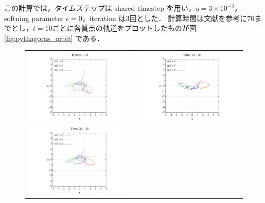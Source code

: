 \documentclass[11pt,a4paper,oneside,onecolumn]{jreport}
\begin{document}
この計算では，タイムステップは shared timestep を用い，$\eta = 3 \times 10^{-3}$，softning parameter $\epsilon = 0$，iteration は3回とした． 計算時間は文献を参考に70までとし，$t = 10$ごとに各質点の軌道をプロットしたものが図 \ref{fig:pythagoras_orbit} である．

\begin{figure}[H]
\begin{tabular}{ccc}
\begin{minipage}[t]{0.45\hsize}
\centering
\includegraphics[width=8cm]{./image/pythagoras_orbit_0to10.pdf}
\end{minipage} &
\begin{minipage}[t]{0.1\hsize}
\end{minipage} &
\begin{minipage}[t]{0.45\hsize}
\centering
\includegraphics[width=8cm]{./image/pythagoras_orbit_10to20.pdf}
\end{minipage}\\
%
\begin{minipage}[t]{0.45\hsize}
\centering
\includegraphics[width=8cm]{./image/pythagoras_orbit_20to30.pdf}

\end{minipage}
\end{tabular}
\end{figure}
\end{document}
